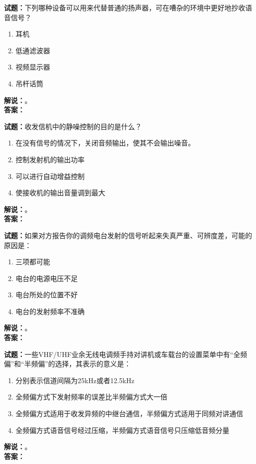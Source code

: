 \documentclass{ctexbook}
\begin{document}
\vspace{\baselineskip}

\noindent\textbf{试题：}下列哪种设备可以用来代替普通的扬声器，可在嘈杂的环境中更好地抄收语音信号？
\begin{enumerate}[leftmargin=3em]
  \item 耳机
  \item 低通滤波器
  \item 视频显示器
  \item 吊杆话筒
\end{enumerate}
\noindent\textbf{解说：}\textbf{}。\\\noindent\textbf{答案：}

\vspace{\baselineskip}

\noindent\textbf{试题：}收发信机中的静噪控制的目的是什么？
\begin{enumerate}[leftmargin=3em]
  \item 在没有信号的情况下，关闭音频输出，使其不会输出噪音。
  \item 控制发射机的输出功率
  \item 可以进行自动增益控制
  \item 使接收机的输出音量调到最大
\end{enumerate}
\noindent\textbf{解说：}\textbf{}。\\\noindent\textbf{答案：}

\vspace{\baselineskip}

\noindent\textbf{试题：}如果对方报告你的调频电台发射的信号听起来失真严重、可辨度差，可能的原因是：
\begin{enumerate}[leftmargin=3em]
  \item 三项都可能
  \item 电台的电源电压不足
  \item 电台所处的位置不好
  \item 电台的发射频率不准确
\end{enumerate}
\noindent\textbf{解说：}\textbf{}。\\\noindent\textbf{答案：}

\vspace{\baselineskip}

\noindent\textbf{试题：}一些VHF/UHF业余无线电调频手持对讲机或车载台的设置菜单中有“全频偏”和“半频偏”的选择，其表示的意义是：
\begin{enumerate}[leftmargin=3em]
  \item 分别表示信道间隔为25\unit{\kHz}或者12.5\unit{\kHz}
  \item 全频偏方式下发射频率的误差比半频偏方式大一倍
  \item 全频偏方式适用于收发异频的中继台通信，半频偏方式适用于同频对讲通信
  \item 全频偏方式语音信号经过压缩，半频偏方式语音信号只压缩低音频分量
\end{enumerate}
\noindent\textbf{解说：}\textbf{}。\\\noindent\textbf{答案：}
\end{document}
